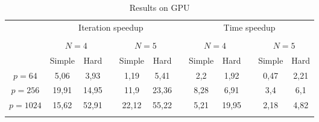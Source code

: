 \documentclass{svproc}
\begin{document}
\begin{table}
                \caption{Results on GPU}
                \label{table:average_AS_GPU}
                \center
                \begin{tabular}{cccccccccccc}
																& \multicolumn{5}{c}{ Iteration speedup} & & \multicolumn{5}{c}{ Time speedup}\\
                               \noalign{\smallskip} \cline{2-6} \cline{8-12}  \\
                               & \multicolumn{2}{c}{ $N=4$ } & & \multicolumn{2}{c}{$N=5$} &  & \multicolumn{2}{c}{ $N=4$ } & & \multicolumn{2}{c}{$N=5$} \\
                               \noalign{\smallskip} \cline{2-3} \cline{5-6}  \cline{8-9} \cline{11-12} \noalign{\smallskip}
                               & Simple & Hard & & Simple & Hard &  & Simple & Hard & & Simple & Hard  \\
                               \noalign{\smallskip} \hline \noalign{\smallskip}                               
                               $p=64$  &    5,06  & 3,93  &   & 1,19 	 & 5,41  &   & 2,2	    & 1,92	 &   & 0,47	& 2,21 \\
                               $p=256$ &    19,91 & 14,95 &   & 11,9 	 & 23,36 &   & 8,28	& 6,91	     &   & 3,4	    & 6,1 \\
							   $p=1024$&    15,62 & 52,91 &   & 22,12	 & 55,22 &   & 5,21	& 19,95      &   & 2,18	& 4,82 \\
                               \noalign{\smallskip}\hline
                \end{tabular}
\end{table}
\end{document}
